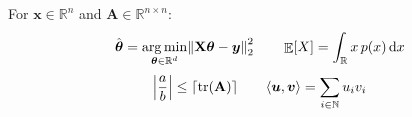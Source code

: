 \documentclass{article}
\newcommand{\R}{\mathbb{R}}
\newcommand{\N}{\mathbb{N}}
\DeclarePairedDelimiter{\abs}{\lvert}{\rvert}
\DeclarePairedDelimiter{\norm}{\lVert}{\rVert}
\DeclarePairedDelimiter{\ceil}{\lceil}{\rceil}
\DeclarePairedDelimiter{\inner}{\langle}{\rangle}
\DeclareMathOperator*{\argmin}{arg\,min}
\DeclareMathOperator{\tr}{tr}
\DeclareMathOperator{\E}{\mathbb{E}}
\newcommand{\dd}{\mathop{}\!\mathrm{d}}
\newcommand{\vect}[1]{\boldsymbol{#1}}
\newcommand{\mat}[1]{\mathbf{#1}}
\begin{document}
For $\vect{x} \in \R^n$ and $\mat{A} \in \R^{n \times n}$:
\[
  \hat{\vect{\theta}} = \argmin_{\vect{\theta} \in \R^d}
    \norm*{\mat{X}\vect{\theta} - \vect{y}}_2^2
  \qquad
  \E[X] = \int_{\R} x \, p(x) \dd x
\]
\[
  \abs*{\frac{a}{b}} \le \ceil{\tr(\mat{A})}
  \qquad
  \inner{\vect{u}, \vect{v}} = \sum_{i \in \N} u_i v_i
\]
\end{document}
